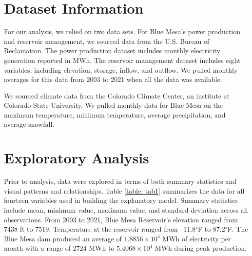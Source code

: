 \documentclass[
  12pt,
]{article}
\begin{document}
\newpage

\hypertarget{dataset-information}{%
\section{Dataset Information}\label{dataset-information}}

For our analysis, we relied on two data sets. For Blue Mesa's power
production and reservoir management, we sourced data from the U.S.
Bureau of Reclamation. The power production dataset includes monthly
electricity generation reported in MWh. The reservoir management dataset
includes eight variables, including elevation, storage, inflow, and
outflow. We pulled monthly averages for this data from 2003 to 2021 when
all the data was available.

We sourced climate data from the Colorado Climate Center, an institute
at Colorado State University. We pulled monthly data for Blue Mesa on
the maximum temperature, minimum temperature, average precipitation, and
average snowfall.

\newpage

\hypertarget{exploratory-analysis}{%
\section{Exploratory Analysis}\label{exploratory-analysis}}

Prior to analysis, data were explored in terms of both summary
statistics and visual patterns and relationships. Table
\ref{table: tab1} summarizes the data for all fourteen variables used in
building the explanatory model. Summary statistics include mean, minimum
value, maximum value, and standard deviation across all observations.
From 2003 to 2021, Blue Mesa Reservoir's elevation ranged from 7438 ft
to 7519. Temperature at the reservoir ranged from --11.8\(^\circ\)F to
87.2\(^\circ\)F. The Blue Mesa dam produced an average of
\ensuremath{1.8856\times 10^{4}} MWh of electricity per month with a
range of 2724 MWh to \ensuremath{5.4068\times 10^{4}} MWh during peak
production.
\end{document}
